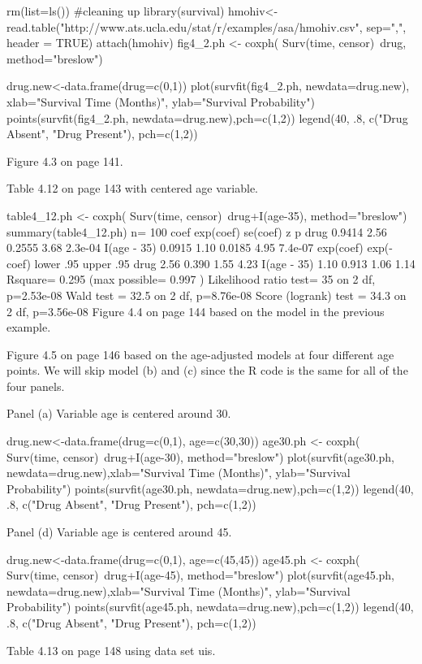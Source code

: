 rm(list=ls()) #cleaning up 
library(survival)
hmohiv<-read.table("http://www.ats.ucla.edu/stat/r/examples/asa/hmohiv.csv", sep=",", header = TRUE)
attach(hmohiv)
fig4_2.ph <- coxph( Surv(time, censor)~drug, method="breslow")

drug.new<-data.frame(drug=c(0,1))
plot(survfit(fig4_2.ph, newdata=drug.new), xlab="Survival Time (Months)",
     ylab="Survival Probability")
points(survfit(fig4_2.ph, newdata=drug.new),pch=c(1,2))
legend(40, .8, c("Drug Absent", "Drug Present"), pch=c(1,2))

Figure 4.3 on page 141.

Table 4.12 on page 143 with centered age variable.

table4_12.ph <- coxph( Surv(time, censor)~drug+I(age-35), method="breslow")
summary(table4_12.ph)
  n= 100 
              coef exp(coef) se(coef)    z       p
drug        0.9414      2.56   0.2555 3.68 2.3e-04
I(age - 35) 0.0915      1.10   0.0185 4.95 7.4e-07
            exp(coef) exp(-coef) lower .95 upper .95
drug             2.56      0.390      1.55      4.23
I(age - 35)      1.10      0.913      1.06      1.14
Rsquare= 0.295   (max possible= 0.997 )
Likelihood ratio test= 35  on 2 df,   p=2.53e-08
Wald test            = 32.5  on 2 df,   p=8.76e-08
Score (logrank) test = 34.3  on 2 df,   p=3.56e-08
Figure 4.4 on page 144 based on the model in the previous example.

Figure 4.5 on page 146 based on the age-adjusted models at four different age points. We will skip model (b) and (c) since the R code is the same for all of the four panels.

Panel (a) Variable age is centered around 30.

drug.new<-data.frame(drug=c(0,1), age=c(30,30))
age30.ph <- coxph( Surv(time, censor)~drug+I(age-30), method="breslow")
plot(survfit(age30.ph, newdata=drug.new),xlab="Survival Time (Months)",
ylab="Survival Probability")
points(survfit(age30.ph, newdata=drug.new),pch=c(1,2))
legend(40, .8, c("Drug Absent", "Drug Present"), pch=c(1,2))

Panel (d) Variable age is centered around 45.

drug.new<-data.frame(drug=c(0,1), age=c(45,45))
age45.ph <- coxph( Surv(time, censor)~drug+I(age-45), method="breslow")
plot(survfit(age45.ph, newdata=drug.new),xlab="Survival Time (Months)",
ylab="Survival Probability")
points(survfit(age45.ph, newdata=drug.new),pch=c(1,2))
legend(40, .8, c("Drug Absent", "Drug Present"), pch=c(1,2))

Table 4.13 on page 148 using data set uis.

